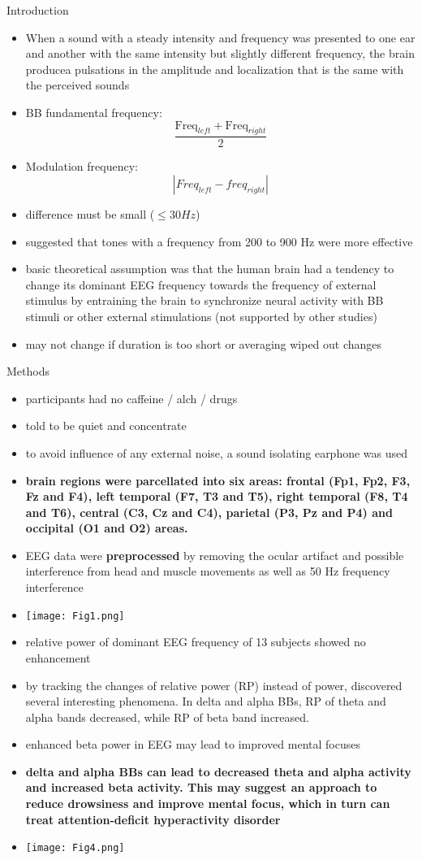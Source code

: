 \documentclass[a4paper]{article}
\begin{document}
Introduction
\begin{itemize}
    \item When a sound with a steady intensity and frequency was presented to one ear and another with the same intensity but slightly different frequency, the brain producea pulsations in the amplitude and localization that is the same with the perceived sounds
    \item BB fundamental frequency: $$\dfrac{\text{Freq}_{left} + \text{Freq}_{right}}{2}$$
    \item Modulation frequency: $$|Freq_{left} - freq_{right}|$$
    \item difference must be small ($\leq30Hz$)
    \item suggested that tones with a frequency from 200 to 900 Hz were more effective
    \item  basic theoretical assumption was that the human brain had a tendency to change its dominant EEG frequency towards the frequency of external stimulus by entraining the brain to synchronize neural activity with BB stimuli or other external stimulations (not supported by other studies)
    \item may not change if duration is too short or averaging wiped out changes
\end{itemize}

Methods
\begin{itemize}
    \item participants had no caffeine / alch / drugs
    \item told to be quiet and concentrate
    \item to avoid inﬂuence of any external noise, a sound isolating earphone was used
    \item \textbf{brain regions were parcellated into six areas: frontal (Fp1, Fp2, F3, Fz and F4), left temporal (F7, T3 and T5), right temporal (F8, T4 and T6), central (C3, Cz and C4), parietal (P3, Pz and P4) and occipital (O1 and O2) areas.}
    \item EEG data were \textbf{preprocessed} by removing the ocular artifact and possible interference from head and muscle movements as well as 50 Hz frequency interference
    \item \texttt{[image: Fig1.png]}
    \item relative power of dominant EEG frequency of 13 subjects showed no enhancement
    \item by tracking the changes of relative power (RP) instead of power, discovered several interesting phenomena. In delta and alpha BBs, RP of theta and alpha bands decreased, while RP of beta band increased.
    \item enhanced beta power in EEG may lead to improved mental focuses
    \item \textbf{delta and alpha BBs can lead to decreased theta and alpha activity and increased beta activity. This may suggest an approach to reduce drowsiness and improve mental focus, which in turn can treat attention-deﬁcit hyperactivity disorder}
    \item \texttt{[image: Fig4.png]}
\end{itemize}
\end{document}
